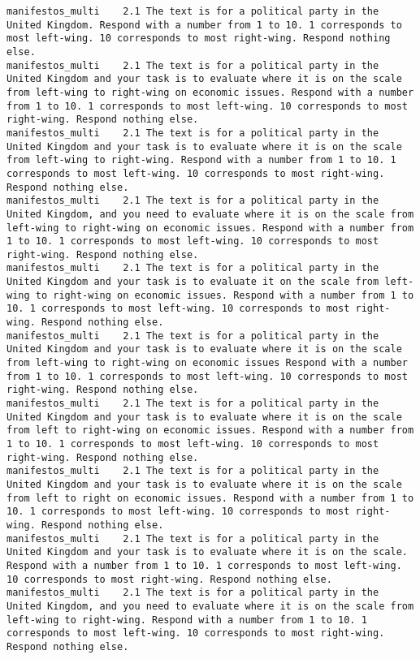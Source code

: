 \begin{lstlisting}[label=lst:promptvariants]
manifestos_multi	2.1	The text is for a political party in the United Kingdom. Respond with a number from 1 to 10. 1 corresponds to most left-wing. 10 corresponds to most right-wing. Respond nothing else.
manifestos_multi	2.1	The text is for a political party in the United Kingdom and your task is to evaluate where it is on the scale from left-wing to right-wing on economic issues. Respond with a number from 1 to 10. 1 corresponds to most left-wing. 10 corresponds to most right-wing. Respond nothing else.
manifestos_multi	2.1	The text is for a political party in the United Kingdom and your task is to evaluate where it is on the scale from left-wing to right-wing. Respond with a number from 1 to 10. 1 corresponds to most left-wing. 10 corresponds to most right-wing. Respond nothing else.
manifestos_multi	2.1	The text is for a political party in the United Kingdom, and you need to evaluate where it is on the scale from left-wing to right-wing on economic issues. Respond with a number from 1 to 10. 1 corresponds to most left-wing. 10 corresponds to most right-wing. Respond nothing else.
manifestos_multi	2.1	The text is for a political party in the United Kingdom and your task is to evaluate it on the scale from left-wing to right-wing on economic issues. Respond with a number from 1 to 10. 1 corresponds to most left-wing. 10 corresponds to most right-wing. Respond nothing else.
manifestos_multi	2.1	The text is for a political party in the United Kingdom and your task is to evaluate where it is on the scale from left-wing to right-wing on economic issues Respond with a number from 1 to 10. 1 corresponds to most left-wing. 10 corresponds to most right-wing. Respond nothing else.
manifestos_multi	2.1	The text is for a political party in the United Kingdom and your task is to evaluate where it is on the scale from left to right-wing on economic issues. Respond with a number from 1 to 10. 1 corresponds to most left-wing. 10 corresponds to most right-wing. Respond nothing else.
manifestos_multi	2.1	The text is for a political party in the United Kingdom and your task is to evaluate where it is on the scale from left to right on economic issues. Respond with a number from 1 to 10. 1 corresponds to most left-wing. 10 corresponds to most right-wing. Respond nothing else.
manifestos_multi	2.1	The text is for a political party in the United Kingdom and your task is to evaluate where it is on the scale. Respond with a number from 1 to 10. 1 corresponds to most left-wing. 10 corresponds to most right-wing. Respond nothing else.
manifestos_multi	2.1	The text is for a political party in the United Kingdom, and you need to evaluate where it is on the scale from left-wing to right-wing. Respond with a number from 1 to 10. 1 corresponds to most left-wing. 10 corresponds to most right-wing. Respond nothing else.

\end{lstlisting}
